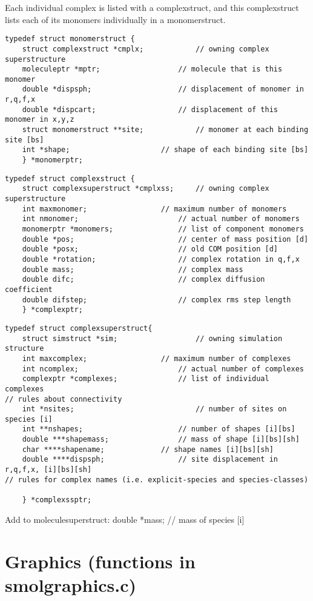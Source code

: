 \documentclass {book}
\begin{document}
Each individual complex is listed with a complexstruct, and this complexstruct lists each of its monomers individually in a monomerstruct.

\begin{lstlisting}
typedef struct monomerstruct {
	struct complexstruct *cmplx;			// owning complex superstructure
	moleculeptr *mptr;					// molecule that is this monomer
	double *dispsph;					// displacement of monomer in r,q,f,x
	double *dispcart;					// displacement of this monomer in x,y,z
	struct monomerstruct **site;			// monomer at each binding site [bs]
	int *shape;						// shape of each binding site [bs]
	} *monomerptr;
\end{lstlisting}


\begin{lstlisting}
typedef struct complexstruct {
	struct complexsuperstruct *cmplxss;		// owning complex superstructure
	int maxmonomer;					// maximum number of monomers
	int nmonomer;						// actual number of monomers
	monomerptr *monomers;				// list of component monomers
	double *pos;						// center of mass position [d]
	double *posx;						// old COM position [d]
	double *rotation;					// complex rotation in q,f,x
	double mass;						// complex mass
	double difc;						// complex diffusion coefficient
	double difstep;						// complex rms step length
	} *complexptr;
\end{lstlisting}


\begin{lstlisting}
typedef struct complexsuperstruct{
	struct simstruct *sim;					// owning simulation structure
	int maxcomplex;					// maximum number of complexes
	int ncomplex;						// actual number of complexes
	complexptr *complexes;				// list of individual complexes
// rules about connectivity
	int *nsites;							// number of sites on species [i]
	int **nshapes;						// number of shapes [i][bs]
	double ***shapemass;				// mass of shape [i][bs][sh]
	char ****shapename;				// shape names [i][bs][sh]
	double ****dispsph;					// site displacement in r,q,f,x, [i][bs][sh]
// rules for complex names (i.e. explicit-species and species-classes)
	
	} *complexssptr;
\end{lstlisting}


Add to moleculesuperstruct:
	double *mass;						// mass of species [i]



\section{Graphics (functions in smolgraphics.c)}
\end{document}
